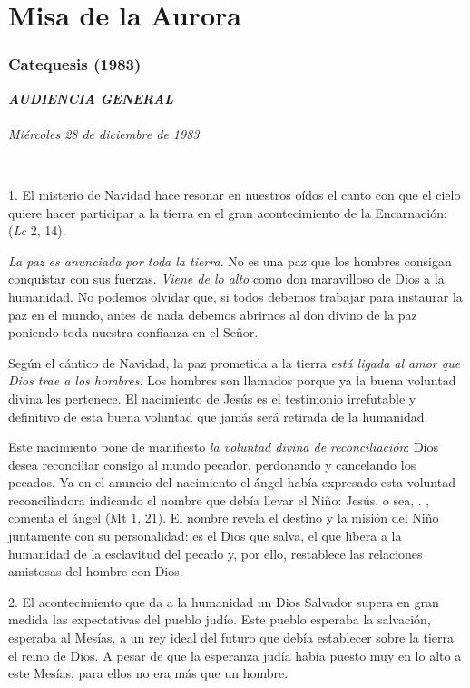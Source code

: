 \section{Misa de la Aurora} \subsubsection{Catequesis (1983)} \textbf{\emph{AUDIENCIA GENERAL\\ }}\\ \emph{Miércoles 28 de diciembre de 1983}

~

1. El misterio de Navidad hace resonar en nuestros oídos el canto con que el cielo quiere hacer participar a la tierra en el gran acontecimiento de la Encarnación:  (\emph{Lc} 2, 14).

\emph{La paz es anunciada por toda la tierra}. No es una paz que los hombres consigan conquistar con sus fuerzas. \emph{Viene de lo alto} como don maravilloso de Dios a la humanidad. No podemos olvidar que, si todos debemos trabajar para instaurar la paz en el mundo, antes de nada debemos abrirnos al don divino de la paz poniendo toda nuestra confianza en el Señor.

Según el cántico de Navidad, la paz prometida a la tierra \emph{está ligada al amor que Dios trae a los hombres}. Los hombres son llamados  porque ya la buena voluntad divina les pertenece. El nacimiento de Jesús es el testimonio irrefutable y definitivo de esta buena voluntad que jamás será retirada de la humanidad.

Este nacimiento pone de manifiesto \emph{la voluntad divina de reconciliación}: Dios desea reconciliar consigo al mundo pecador, perdonando y cancelando los pecados. Ya en el anuncio del nacimiento el ángel había expresado esta voluntad reconciliadora indicando el nombre que debía llevar el Niño: Jesús, o sea, . , comenta el ángel (Mt 1, 21). El nombre revela el destino y la misión del Niño juntamente con su personalidad: es el Dios que salva, el que libera a la humanidad de la esclavitud del pecado y, por ello, restablece las relaciones amistosas del hombre con Dios.

2. El acontecimiento que da a la humanidad un Dios Salvador supera en gran medida las expectativas del pueblo judío. Este pueblo esperaba la salvación, esperaba al Mesías, a un rey ideal del futuro que debía establecer sobre la tierra el reino de Dios. A pesar de que la esperanza judía había puesto muy en lo alto a este Mesías, para ellos no era más que un hombre.

